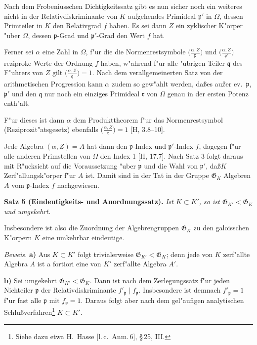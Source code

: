 \documentclass[12pt,a4paper]{article}
\theoremstyle{plain}
\begin{document}
Nach dem Frobeniusschen Dichtigkeitssatz gibt es nun sicher noch ein weiteres nicht in der Relativdiskriminante von $K$ aufgehendes Primideal $\mathfrak{p}'$ in $\Omega$, dessen Primteiler in $K$ den Relativgrad $f$ haben. Es sei dann $Z$ ein zyklischer K"orper "uber $\Omega$, dessen $\mathfrak{p}$-Grad und $\mathfrak{p}'$-Grad den Wert $f$ hat.

Ferner sei $\alpha$ eine Zahl in $\Omega$, f"ur die die Normenrestsymbole $\bigl(\frac{\alpha, Z}{\mathfrak{p}}\bigr)$ und $\bigl(\frac{\alpha, Z}{\mathfrak{p}'}\bigr)$ reziproke Werte der Ordnung $f$ haben, w"ahrend f"ur alle "ubrigen Teiler $\mathfrak{q}$ des F"uhrers von $Z$ gilt $\bigl(\frac{\alpha, Z}{\mathfrak{q}}\bigr) = 1$. Nach dem verallgemeinerten Satz von der arithmetischen Progression kann $\alpha$ zudem so gew"ahlt werden, da\ss es au\ss er ev.\ $\mathfrak{p}$, $\mathfrak{p}'$ und den $\mathfrak{q}$ nur noch ein einziges Primideal $\mathfrak{r}$ von $\Omega$ genau in der ersten Potenz enth"alt.

F"ur dieses ist dann $\alpha$ dem Produkttheorem f"ur das Normenrestsymbol (Reziprozit"atsgesetz) ebenfalls $\bigl(\frac{\alpha, Z}{\mathfrak{r}}\bigr) = 1$ [H, 3.8--10].

Jede Algebra $(\alpha, Z) = A$ hat dann den $\mathfrak{p}$-Index und $\mathfrak{p}'$-Index $f$, dagegen f"ur alle anderen Primstellen von $\Omega$ den Index 1 [H, 17.7]. Nach Satz 3 folgt daraus mit R"ucksicht auf die Voraussetzung "uber $\mathfrak{p}$ und die Wahl von $\mathfrak{p}'$, da\ss $K$ Zerf"allungsk"orper f"ur $A$ ist. Damit sind in der Tat in der Gruppe $\mathfrak{G}_K$ Algebren $A$ vom $\mathfrak{p}$-Index $f$ nachgewiesen.

\medskip\noindent\textbf{Satz 5 (Eindeutigkeits- und Anordnungssatz).}
\textit{Ist $K \subset K'$, so ist $\mathfrak{G}_{K'} < \mathfrak{G}_K$ und umgekehrt.}

Insbesondere ist also die Zuordnung der Algebrengruppen $\mathfrak{G}_K$ zu den galoisschen K"orpern $K$ eine umkehrbar eindeutige.

\noindent\textit{Beweis.}
\textbf{a)} Aus $K \subset K'$ folgt trivialerweise $\mathfrak{G}_{K'} < \mathfrak{G}_K$; denn jede von $K$ zerf"allte Algebra $A$ ist a fortiori eine von $K'$ zerf"allte Algebra $A'$.

\textbf{b)} Sei umgekehrt $\mathfrak{G}_{K'} < \mathfrak{G}_K$. Dann ist nach dem Zerlegungssatz f"ur jeden Nichteiler $\mathfrak{p}$ der Relativdiskriminante $f'_{\mathfrak{p}} \mid f_{\mathfrak{p}}$. Insbesondere ist demnach $f'_{\mathfrak{p}} = 1$ f"ur fast alle $\mathfrak{p}$ mit $f_{\mathfrak{p}} = 1$. Daraus folgt aber nach dem gel"aufigen analytischen Schlu\ss verfahren\footnote{Siehe dazu etwa H.\ Hasse [l.\,c.\ Anm.\,6], \S\,25, III.} $K \subset K'$.
\end{document}
